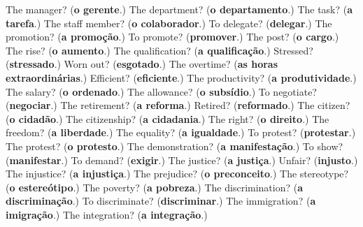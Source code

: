 \begin{tcolorbox}[breakable,colback=teal!4,colframe=teal!35!black,title={Before you move on}]
The manager? (\textbf{o gerente}.) The department? (\textbf{o departamento}.) The task? (\textbf{a tarefa}.) The staff member? (\textbf{o colaborador}.) To delegate? (\textbf{delegar}.) The promotion? (\textbf{a promoção}.) To promote? (\textbf{promover}.) The post? (\textbf{o cargo}.) The rise? (\textbf{o aumento}.) The qualification? (\textbf{a qualificação}.) Stressed? (\textbf{stressado}.) Worn out? (\textbf{esgotado}.) The overtime? (\textbf{as horas extraordinárias}.) Efficient? (\textbf{eficiente}.) The productivity? (\textbf{a produtividade}.) The salary? (\textbf{o ordenado}.) The allowance? (\textbf{o subsídio}.) To negotiate? (\textbf{negociar}.) The retirement? (\textbf{a reforma}.) Retired? (\textbf{reformado}.) The citizen? (\textbf{o cidadão}.) The citizenship? (\textbf{a cidadania}.) The right? (\textbf{o direito}.) The freedom? (\textbf{a liberdade}.) The equality? (\textbf{a igualdade}.) To protest? (\textbf{protestar}.) The protest? (\textbf{o protesto}.) The demonstration? (\textbf{a manifestação}.) To show? (\textbf{manifestar}.) To demand? (\textbf{exigir}.) The justice? (\textbf{a justiça}.) Unfair? (\textbf{injusto}.) The injustice? (\textbf{a injustiça}.) The prejudice? (\textbf{o preconceito}.) The stereotype? (\textbf{o estereótipo}.) The poverty? (\textbf{a pobreza}.) The discrimination? (\textbf{a discriminação}.) To discriminate? (\textbf{discriminar}.) The immigration? (\textbf{a imigração}.) The integration? (\textbf{a integração}.)
\end{tcolorbox}
